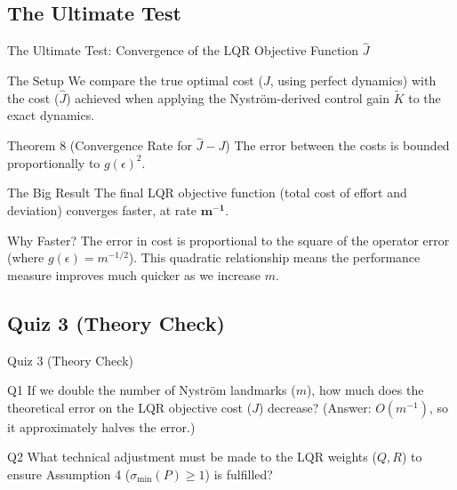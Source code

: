 \documentclass{beamer}
\begin{document}
\subsection{The Ultimate Test}
\begin{frame}[allowframebreaks]{The Ultimate Test: Convergence of the LQR Objective Function 
  \texorpdfstring{$\hat{J}$}{Jhat}}
  
  \begin{block}{The Setup}
    We compare the true optimal cost ($J$, using perfect dynamics) with the cost ($\hat{J}$) achieved when applying the Nyström-derived control gain $\widetilde{K}$ to the exact dynamics.
  \end{block}

  \begin{block}{Theorem 8 (Convergence Rate for $\hat{J} - J$)}
    The error between the costs is bounded proportionally to $g(\epsilon)^2$.
  \end{block}

  \framebreak

  \begin{block}{The Big Result}
    The final LQR objective function (total cost of effort and deviation) converges faster, at rate $\mathbf{m^{-1}}$.
  \end{block}

  \begin{block}{Why Faster?}
    The error in cost is proportional to the square of the operator error (where $g(\epsilon)=m^{-1/2}$).  
    This quadratic relationship means the performance measure improves much quicker as we increase $m$.
  \end{block}

\end{frame}

\subsection{Quiz 3 (Theory Check)}
\begin{frame}{Quiz 3 (Theory Check)}
    \begin{block}{Q1}
         If we double the number of Nyström landmarks ($m$), how much does the theoretical error on the LQR objective cost ($J$) decrease? (Answer: $O(m^{-1})$, so it approximately halves the error.)
    \end{block}
    \begin{block}{Q2}
        What technical adjustment must be made to the LQR weights ($Q, R$) to ensure Assumption 4 ($\sigma_{\min}(P) \ge 1$) is fulfilled?
    \end{block}
\end{frame}
\end{document}
